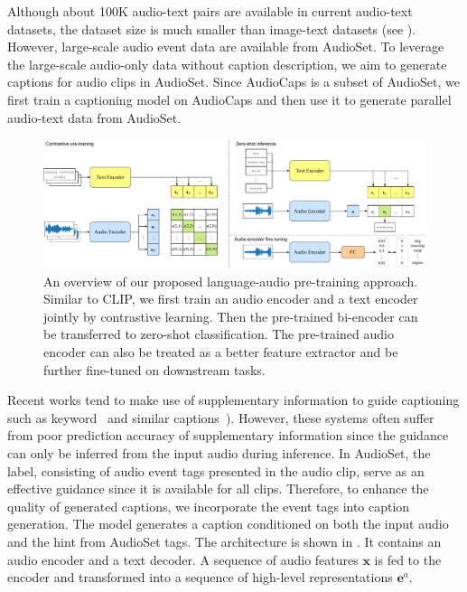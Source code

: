 \documentclass[sigconf,anonymous,review]{acmart}
\begin{document}
Although about 100K audio-text pairs are available in current audio-text datasets, the dataset size is much smaller than image-text datasets (see ). %
However, large-scale audio event data are available from AudioSet. 
To leverage the large-scale audio-only data without caption description, we aim to generate captions for audio clips in AudioSet.
Since AudioCaps is a subset of AudioSet, we first train a captioning model on AudioCaps and then use it to generate parallel audio-text data from AudioSet.
\begin{figure}[!htpb]
    \centering
    \includegraphics[width=\linewidth]{figs/CLAP.pdf}
    \caption{An overview of our proposed language-audio pre-training approach. Similar to CLIP, we first train an audio encoder and a text encoder jointly by contrastive learning. Then the pre-trained bi-encoder can be transferred to zero-shot classification. The pre-trained audio encoder can also be treated as a better feature extractor and be further fine-tuned on downstream tasks.}
    \label{fig:CLAP_framework}
\end{figure}
Recent works tend to make use of supplementary information to guide captioning such as keyword~\cite{eren2020semantic} and similar captions~\cite{koizumi2020audio}).
However, these systems often suffer from poor prediction accuracy of supplementary information since the guidance can only be inferred from the input audio during inference.
In AudioSet, the label, consisting of audio event tags presented in the audio clip, serve as an effective guidance since it is available for all clips.
Therefore, to enhance the quality of generated captions, we incorporate the event tags into caption generation.
The model generates a caption conditioned on both the input audio and the hint from AudioSet tags.
The architecture is shown in .
It contains an audio encoder and a text decoder.
A sequence of audio features $\mathbf{x}$ is fed to the encoder and transformed into a sequence of high-level representations $\mathbf{e}^{a}$.
\end{document}
